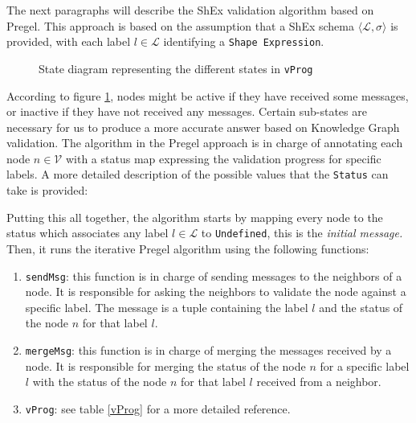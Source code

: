 The next paragraphs will describe the ShEx validation algorithm based on Pregel. This approach is based on the assumption that a ShEx schema $\langle  \mathcal{L},\sigma \rangle$ is provided,  with each label $l \in \mathcal{L}$ identifying a \texttt{Shape Expression}.

\begin{figure}[H]
    \centering
    
    \caption[State diagram representing the different states in \texttt{vProg}]{State diagram representing the different states in \texttt{vProg}~\cite{https://doi.org/10.48550/arxiv.2110.11709}}
    \label{fig:state:pregel}
\end{figure}

According to figure \ref{fig:state:pregel}, nodes might be active if they have received some messages, or inactive if they have not received any messages. Certain sub-states are necessary for us to produce a more accurate answer based on Knowledge Graph validation. The algorithm in the Pregel approach is in charge of annotating each node $n\in\mathcal{V}$ with a status map expressing the validation progress for specific labels. A more detailed description of the possible values that the \texttt{Status} can take is provided:

\begin{center}
    
\end{center}

Putting this all together, the algorithm starts by mapping every node to the status which associates any label $l \in \mathcal{L}$ to \texttt{Undefined}, this is the \textit{initial message.} Then, it runs the iterative Pregel algorithm using the following functions:

\begin{enumerate}
    \itemsep0.5em
    \item \texttt{sendMsg}: this function is in charge of sending messages to the neighbors of a node. It is responsible for asking the neighbors to validate the node against a specific label. The message is a tuple containing the label $l$ and the status of the node $n$ for that label $l$.
    \item \texttt{mergeMsg}: this function is in charge of merging the messages received by a node. It is responsible for merging the status of the node $n$ for a specific label $l$ with the status of the node $n$ for that label $l$ received from a neighbor.
    \item \texttt{vProg}: see table \ref{vProg} for a more detailed reference.
\end{enumerate}

